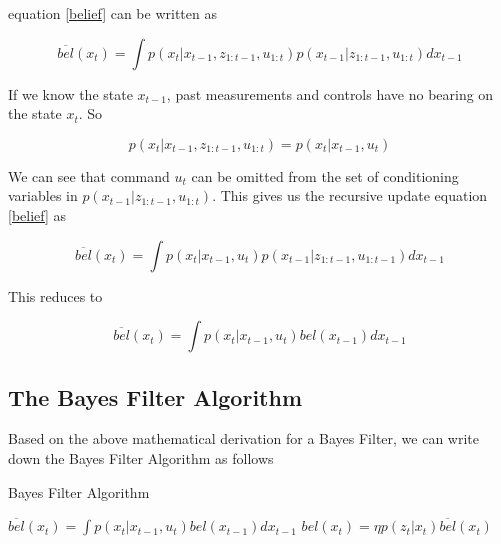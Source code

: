 \documentclass[conference]{IEEEtran}
\begin{document}
equation \ref{belief} can be written as 

\begin{equation}
\overline{bel}(x_t) = \int p(x_t|x_{t-1}, z_{1:t-1}, u_{1:t}) p(x_{t-1}|z_{1:t-1}, u_{1:t}) dx_{t-1}
\end{equation}

If we know the state $x_{t-1}$, past measurements and controls have no bearing on the state $x_t$. So

\begin{equation}
p(x_t|x_{t-1}, z_{1:t-1}, u_{1:t}) = p(x_t|x_{t-1}, u_t)
\end{equation}

We can see that command $u_t$ can be omitted from the set of conditioning variables in $p(x_{t-1}|z_{1:t-1}, u_{1:t})$. This gives us the recursive update equation \ref{belief} as

\begin{equation}
\overline{bel}(x_t) = \int p(x_t|x_{t-1}, u_t) p(x_{t-1}|z_{1:t-1}, u_{1:t-1}) dx_{t-1}
\end{equation}

This reduces to

\begin{equation}
\overline{bel}(x_t) = \int p(x_t|x_{t-1}, u_t) bel(x_{t-1}) dx_{t-1}
\end{equation}

\subsection{The Bayes Filter Algorithm}

Based on the above mathematical derivation for a Bayes Filter, we can write down the Bayes Filter Algorithm as follows

\begin{minipage}{\linewidth}
  \begin{algorithm}[H]
    \caption{Bayes Filter Algorithm}\label{AlgBayes}
    \begin{algorithmic}[1]
		\State $\overline{bel}(x_t) = \int p(x_t|x_{t-1}, u_t) bel(x_{t-1}) dx_{t-1}$
		\State $bel(x_t)= \eta p(z_t|x_t) \overline{bel}(x_t)$
	\EndFor
      \EndProcedure
    \end{algorithmic}
  \end{algorithm}
\end{minipage}\\\\
\end{document}
